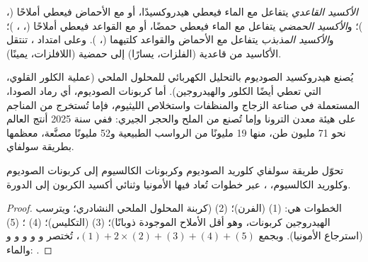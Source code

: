 \begin{definition}\label{def:b1:s-block:oxide-character}
\emph{الأكسيد القاعدي} يتفاعل مع الماء فيعطي
هيدروكسيدًا، أو مع الأحماض فيعطي أملاحًا (، )؛
و\emph{الأكسيد الحمضي} يتفاعل مع الماء فيعطي حمضًا،
أو مع القواعد فيعطي أملاحًا (، ، )؛
و\emph{الأكسيد المذبذب} يتفاعل مع الأحماض
والقواعد كلتيهما (، ). وعلى امتداد ، تنتقل الأكاسيد من قاعدية
(الفلزات، يسارًا) إلى حمضية (اللافلزات، يمينًا).
\end{definition}

يُصنع هيدروكسيد الصوديوم بالتحليل الكهربائي للمحلول الملحي (عملية
الكلور القلوي، التي تعطي أيضًا الكلور والهيدروجين). أما كربونات الصوديوم، أي رماد
الصودا، المستعملة في صناعة الزجاج والمنظفات واستخلاص الليثيوم، فإما تُستخرج من المناجم
على هيئة معدن الترونا وإما تُصنع من الملح والحجر الجيري: ففي سنة 2025
أنتج العالم نحو 71 مليون طن، منها 19 مليونًا من الرواسب الطبيعية و52
مليونًا مصنَّعة، معظمها بطريقة سولفاي.

\begin{proposition}\label{prop:b1:s-block:solvay}
تحوّل طريقة سولفاي كلوريد الصوديوم وكربونات الكالسيوم إلى
كربونات الصوديوم وكلوريد الكالسيوم، ، عبر خطوات تُعاد فيها الأمونيا وثنائي أكسيد الكربون إلى الدورة.
\end{proposition}

\begin{proof}
الخطوات هي: (1)  (الفرن)؛ (2)  (كربنة المحلول الملحي النشادري؛ ويترسب
الهيدروجين كربونات، وهو أقل الأملاح الموجودة ذوبانًا)؛ (3)
 (التكليس)؛ (4) ؛ (5)  (استرجاع
الأمونيا). وبجمع $(1) + 2\times(2) + (3) + (4) + (5)$، تُختصر 
و و و و و والماء:
.
\end{proof}


